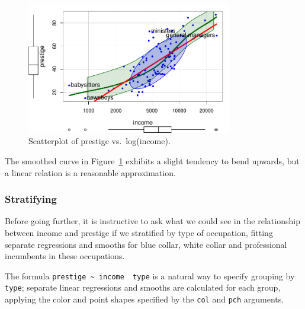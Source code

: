 \documentclass[
  letterpaper,
  10pt,
  krantz2]{krantz}
\begin{document}
\begin{figure}

{\centering \includegraphics[width=0.8\textwidth,height=\textheight]{figs/ch03/fig-Prestige-scatterplot2-1.pdf}

}

\caption{\label{fig-Prestige-scatterplot2}Scatterplot of prestige
vs.~log(income).}

\end{figure}

The smoothed curve in Figure~\ref{fig-Prestige-scatterplot2} exhibits a
slight tendency to bend upwards, but a linear relation is a reasonable
approximation.

\hypertarget{stratifying}{%
\subsubsection{Stratifying}\label{stratifying}}

Before going further, it is instructive to ask what we could see in the
relationship between income and prestige if we stratified by type of
occupation, fitting separate regressions and smooths for blue collar,
white collar and professional incumbents in these occupations.

The formula
\texttt{prestige\ \textasciitilde{}\ income\ \textbar{}\ type} is a
natural way to specify grouping by \texttt{type}; separate linear
regressions and smooths are calculated for each group, applying the
color and point shapes specified by the \texttt{col} and \texttt{pch}
arguments.
\end{document}
